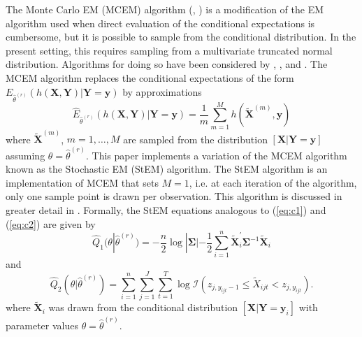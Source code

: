 \documentclass[12pt]{article}
\begin{document}
The Monte Carlo EM (MCEM) algorithm (\cite{Wei90}, \cite{Nielsen00}) is a
modification of the EM algorithm used when direct evaluation of the
conditional expectations is cumbersome, but it is possible to sample from
the conditional distribution. In the present setting, this requires sampling from a multivariate truncated normal distribution. Algorithms for doing so have been considered by \cite{RodriguezYam04}%
, \cite{Wilhelm10}, and \cite{Botev15}. The MCEM algorithm replaces the
conditional expectations of the form $E_{\hat{\theta}^{(r)}}\left(h(\mathbf{X},\mathbf{Y}) | 
\mathbf{Y}=\mathbf{y} \right)$ by approximations
\begin{equation*}
\hat E_{\hat{\theta}^{(r)}}\left(h(\mathbf{X},\mathbf{Y}) | 
\mathbf{Y}=\mathbf{y} \right) =
\frac{1}{m} \sum_{m=1}^{M} h(\tilde{\mathbf{X}}^{(m)},\mathbf{y})
\end{equation*}
where $\tilde{\mathbf{X}}^{(m)}$, $m=1,\ldots,M$ are sampled from the
distribution $[\mathbf{X}|\mathbf{Y}=\mathbf{y}]$ assuming $\theta=\hat{\theta}^{(r)}$.
This paper implements a variation of the MCEM algorithm known as the Stochastic EM (StEM) algorithm. The StEM algorithm is an implementation of MCEM
that sets $M=1$, i.e. at each iteration of the algorithm, only one sample point is drawn per observation. This algorithm is discussed in greater detail in \cite{Nielsen00}.
Formally, the StEM equations analogous to (\ref{eq:c1}) and (\ref{eq:c2}) are
given by 
\begin{equation}  \label{eq:c1v2}
\hat Q_1 ( \theta | \hat{\theta}^{(r)} ) = -\frac{n}{2} \log|%
\boldsymbol{\Sigma}| -\frac{1}{2} \sum_{i=1}^{n} \tilde{\mathbf{X}}%
_{i}^{\prime }\boldsymbol{\Sigma}^{-1} \tilde{\mathbf{X}}_{i}
\end{equation}
and 
\begin{equation}  \label{eq:c2v2}
\hat Q_2 ( \theta | \hat{\theta}^{(r)} ) = \sum_{i = 1}^n \sum_{j
= 1}^J \sum_{t = 1}^T \log \mathcal{I} \left(z_{j,y_{ijt}-1} \leq \tilde{X}%
_{ijt} < z_{j,y_{ijt}} \right).
\end{equation}
where $\tilde{\mathbf{X}}_{i}$ was drawn from the conditional distribution $[\mathbf{X}|\mathbf{Y}=\mathbf{y}_{i}]$ with parameter values $\theta=\hat{\theta}^{(r)}$.
\end{document}
